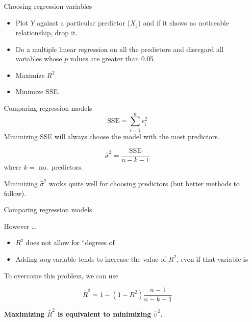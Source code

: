 \documentclass[14pt]{beamer}
\makeatletter
\def\biz{\begin{itemize}[<+-| alert@+>]}
\def\eiz{\end{itemize}}
\makeatother
\begin{document}
\begin{frame}{Choosing regression variables}


\biz
\item Plot $Y$ against a particular predictor ($X_j$)
       and if it shows no noticeable relationship,  drop it.


\item Do a multiple linear regression on all the predictors
      and
      disregard all variables whose  $p$ values are greater than 0.05.

\item Maximize $R^2$

\item Minimize SSE.
\eiz
\end{frame}%

\begin{frame}{Comparing regression models}
\[\text{SSE} = \sum_{i=1}^n e_i^2 \]
Minimizing SSE will always choose the model with the most predictors.

\pause
{}
\[
\hat{\sigma}^2 = \frac{\text{SSE}}{n-k-1}
\]
where $k=$ no.\ predictors.\pause

Minimizing $\hat{\sigma}^2$ works quite well for choosing predictors (but better methods to follow).

\end{frame}


\begin{frame}{Comparing regression models}

However \dots
\biz
\item $R^2$  does not allow for ``degrees of 

\item Adding \textit{any} variable tends to increase the value of $R^2$, even if that variable is
\eiz\pause

To overcome   this problem, we can use 
\begin{block}{}
\[
\bar{R}^2 = 1-(1-R^2)\frac{n-1}{n-k-1}
\]
\end{block}
\pause

\centerline{\textcolor[rgb]{0.8,0.00,0.00}{\textbf{Maximizing $\bar{R}^2$ is equivalent to minimizing $\hat\sigma^2$.}}}

\end{frame}
\end{document}
